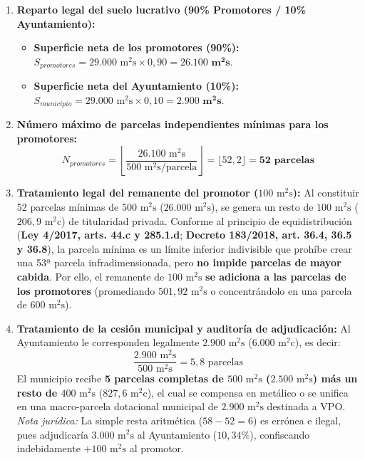\documentclass[11pt,a4paper]{article}
\begin{document}
\begin{enumerate}
  \item \textbf{Reparto legal del suelo lucrativo (90\% Promotores / 10\% Ayuntamiento):}
  \begin{itemize}
    \item \textbf{Superficie neta de los promotores (90\%):} 
    $S_{promotores} = 29.000\text{ m}^2\text{s} \times 0,90 = \mathbf{26.100\text{ m}^2\text{s}}$.
    \item \textbf{Superficie neta del Ayuntamiento (10\%):} 
    $S_{municipio} = 29.000\text{ m}^2\text{s} \times 0,10 = \mathbf{2.900\text{ m}^2\text{s}}$.
  \end{itemize}

  \item \textbf{Número máximo de parcelas independientes mínimas para los promotores:}
  \[
    N_{promotores} = \left\lfloor \frac{26.100\text{ m}^2\text{s}}{500\text{ m}^2\text{s/parcela}} \right\rfloor = \lfloor 52,2 \rfloor = \mathbf{52\text{ parcelas}}
  \]

  \item \textbf{Tratamiento legal del remanente del promotor ($100\text{ m}^2\text{s}$):}
  Al constituir 52 parcelas mínimas de $500\text{ m}^2\text{s}$ ($26.000\text{ m}^2\text{s}$), se genera un resto de \textbf{$100\text{ m}^2\text{s}$} ($206,9\text{ m}^2\text{c}$) de titularidad privada. 
  Conforme al principio de equidistribución (\textbf{Ley 4/2017, arts. 44.c y 285.1.d}; \textbf{Decreto 183/2018, art. 36.4, 36.5 y 36.8}), la parcela mínima es un límite inferior indivisible que prohíbe crear una 53ª parcela infradimensionada, pero \textbf{no impide parcelas de mayor cabida}.
  Por ello, el remanente de $100\text{ m}^2\text{s}$ \textbf{se adiciona a las parcelas de los promotores} (promediando $501,92\text{ m}^2\text{s}$ o concentrándolo en una parcela de $600\text{ m}^2\text{s}$).

  \item \textbf{Tratamiento de la cesión municipal y auditoría de adjudicación:}
  Al Ayuntamiento le corresponden legalmente $2.900\text{ m}^2\text{s}$ ($6.000\text{ m}^2\text{c}$), es decir:
  \[
    \frac{2.900\text{ m}^2\text{s}}{500\text{ m}^2\text{s}} = 5,8\text{ parcelas}
  \]
  El municipio recibe \textbf{5 parcelas completas de $500\text{ m}^2\text{s}$ ($2.500\text{ m}^2\text{s}$) más un resto de $400\text{ m}^2\text{s}$} ($827,6\text{ m}^2\text{c}$), el cual se compensa en metálico o se unifica en una macro-parcela dotacional municipal de $2.900\text{ m}^2\text{s}$ destinada a VPO.
  \textit{Nota jurídica:} La simple resta aritmética ($58 - 52 = 6$) es errónea e ilegal, pues adjudicaría $3.000\text{ m}^2\text{s}$ al Ayuntamiento ($10,34\%$), confiscando indebidamente $+100\text{ m}^2\text{s}$ al promotor.
\end{enumerate}
\end{document}
